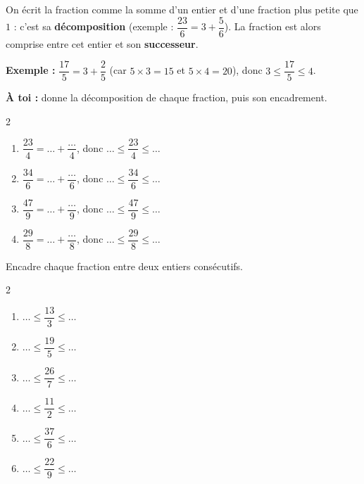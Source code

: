 \documentclass[11pt]{article}
\begin{document}
\begin{exercice}
On écrit la fraction comme la somme d'un entier et d'une fraction plus petite que $1$ : c'est sa \textbf{décomposition} (exemple : $\dfrac{23}{6} = 3 + \dfrac{5}{6}$). La fraction est alors comprise entre cet entier et son \textbf{successeur}.
\vspace{.4em}

\textbf{Exemple :} $\dfrac{17}{5} = 3 + \dfrac{2}{5}$ (car $5 \times 3 = 15$ et $5 \times 4 = 20$), donc $3 \leqslant \dfrac{17}{5} \leqslant 4$.

\textbf{À toi :} donne la décomposition de chaque fraction, puis son encadrement.
\begin{multicols}{2}
\begin{enumerate}[itemsep=.6em]
\item $\dfrac{23}{4} = \ldots + \dfrac{\ldots}{4}$, donc $\ldots \leqslant \dfrac{23}{4} \leqslant \ldots$
\item $\dfrac{34}{6} = \ldots + \dfrac{\ldots}{6}$, donc $\ldots \leqslant \dfrac{34}{6} \leqslant \ldots$
\item $\dfrac{47}{9} = \ldots + \dfrac{\ldots}{9}$, donc $\ldots \leqslant \dfrac{47}{9} \leqslant \ldots$
\item $\dfrac{29}{8} = \ldots + \dfrac{\ldots}{8}$, donc $\ldots \leqslant \dfrac{29}{8} \leqslant \ldots$
\end{enumerate}
\end{multicols}
\end{exercice}

\begin{exercice}
Encadre chaque fraction entre deux entiers consécutifs.
\begin{multicols}{2}
\begin{enumerate}[itemsep=.4em]
\item $\ldots \leqslant \dfrac{13}{3} \leqslant \ldots$
\item $\ldots \leqslant \dfrac{19}{5} \leqslant \ldots$
\item $\ldots \leqslant \dfrac{26}{7} \leqslant \ldots$
\item $\ldots \leqslant \dfrac{11}{2} \leqslant \ldots$
\item $\ldots \leqslant \dfrac{37}{6} \leqslant \ldots$
\item $\ldots \leqslant \dfrac{22}{9} \leqslant \ldots$
\end{enumerate}
\end{multicols}
\end{exercice}
\end{document}
